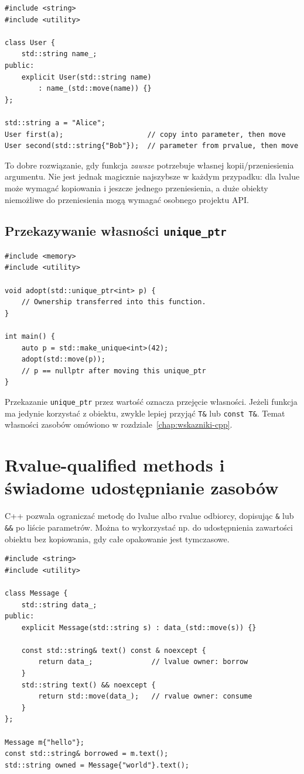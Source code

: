 \begin{lstlisting}
#include <string>
#include <utility>

class User {
    std::string name_;
public:
    explicit User(std::string name)
        : name_(std::move(name)) {}
};

std::string a = "Alice";
User first(a);                    // copy into parameter, then move
User second(std::string{"Bob"});  // parameter from prvalue, then move
\end{lstlisting}

To dobre rozwiązanie, gdy funkcja \emph{zawsze} potrzebuje własnej
kopii/przeniesienia argumentu. Nie jest jednak magicznie
najszybsze w każdym przypadku: dla lvalue może wymagać kopiowania
i jeszcze jednego przeniesienia, a duże obiekty niemożliwe do
przeniesienia mogą wymagać osobnego projektu API.

\subsection{Przekazywanie własności \texttt{unique\_ptr}}

\begin{lstlisting}
#include <memory>
#include <utility>

void adopt(std::unique_ptr<int> p) {
    // Ownership transferred into this function.
}

int main() {
    auto p = std::make_unique<int>(42);
    adopt(std::move(p));
    // p == nullptr after moving this unique_ptr
}
\end{lstlisting}

Przekazanie \texttt{unique\_ptr} przez wartość oznacza przejęcie
własności. Jeżeli funkcja ma jedynie korzystać z obiektu,
zwykle lepiej przyjąć \texttt{T\&} lub \texttt{const T\&}.
Temat własności zasobów omówiono w rozdziale~\ref{chap:wskazniki-cpp}.

\section{Rvalue-qualified methods i świadome udostępnianie zasobów}
\label{sec:move-ref-qualified}

C++ pozwala ograniczać metodę do lvalue albo rvalue odbiorcy,
dopisując \texttt{\&} lub \texttt{\&\&} po liście parametrów.
Można to wykorzystać np. do udostępnienia zawartości obiektu
bez kopiowania, gdy całe opakowanie jest tymczasowe.

\begin{lstlisting}
#include <string>
#include <utility>

class Message {
    std::string data_;
public:
    explicit Message(std::string s) : data_(std::move(s)) {}

    const std::string& text() const & noexcept {
        return data_;              // lvalue owner: borrow
    }
    std::string text() && noexcept {
        return std::move(data_);   // rvalue owner: consume
    }
};

Message m{"hello"};
const std::string& borrowed = m.text();
std::string owned = Message{"world"}.text();
\end{lstlisting}

